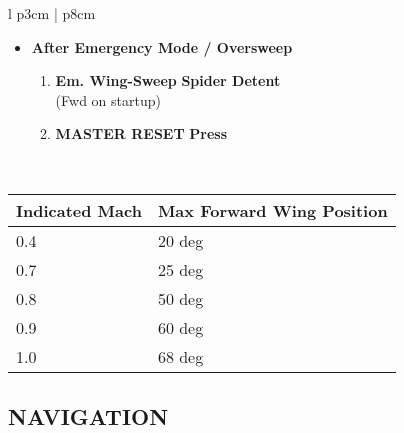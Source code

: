 \documentclass[8pt,usenames,dvipsnames,twoside]{article}
\begin{document}
\begin{center}
\begin{longtable}{l p{3cm} | p{8cm}}
\begin{minipage}[t]{\linewidth}
					\vspace{-7pt}
					\begin{itemize}
						\item \textbf{After Emergency Mode / Oversweep}
						\begin{enumerate}[label=(\alph*)]
							\item \textbf{Em. Wing-Sweep} \dotfill \textbf{Spider Detent} \\
							\hfill (Fwd on startup)
							\item \textbf{MASTER RESET} \dotfill \textbf{Press}
						\end{enumerate}
					\end{itemize}
				\end{minipage} \\
				\bottomrule
			\end{longtable}
		\end{center}
		\begin{center}
			\begin{tabular}{p{3cm} | p{5cm}}
				\toprule
				\textbf{Indicated Mach} & \textbf{Max Forward Wing Position} \\
				\midrule
				0.4 & 20 deg \\
				\midrule
				0.7 & 25 deg \\
				\midrule
				0.8 & 50 deg \\
				\midrule
				0.9 & 60 deg \\
				\midrule
				1.0 & 68 deg \\
				\bottomrule
			\end{tabular}
		\end{center}
		
		\clearpage
		
		\subsection{NAVIGATION}
		
		\cleardoublepage
		
\end{document}
